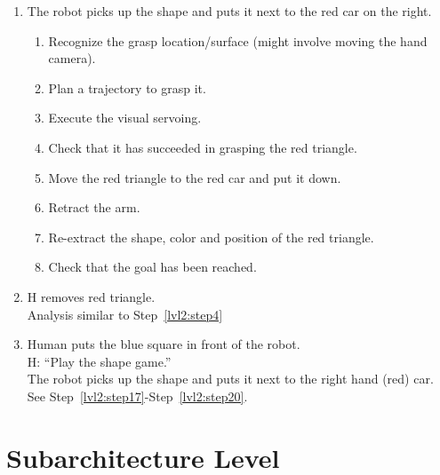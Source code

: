 \documentclass{article}
\begin{document}
\begin{enumerate}
\item \label{lvl2:step19} The robot picks up the shape and puts it
  next to the red car on the right.
  \begin{enumerate}
  \item \label{lvl2:step19:detail1} Recognize the grasp
    location/surface (might involve moving the hand camera).
  \item \label{lvl2:step19:detail2} Plan a trajectory to grasp it.
  \item \label{lvl2:step19:detail3} Execute the visual servoing.
  \item \label{lvl2:step19:detail4} Check that it has succeeded in
    grasping the red triangle.
  \item \label{lvl2:step19:detail5} Move the red triangle to the red
    car and put it down.
  \item \label{lvl2:step19:detail6} Retract the arm.
  \item \label{lvl2:step19:detail7} Re-extract the shape, color and
    position of the red triangle.
  \item \label{lvl2:step19:detail8} Check that the goal has been
    reached.
  \end{enumerate}

\item \label{lvl2:step20}
  H removes red triangle.\\
  Analysis similar to Step~\ref{lvl2:step4}

\item \label{lvl2:step21}
  Human puts the blue square in front of the robot.\\
  H: ``Play the shape game.''\\
  The robot picks up the shape and puts it next to the right hand
  (red) car.\\
  See Step~\ref{lvl2:step17}-Step~\ref{lvl2:step20}.

\end{enumerate}




\section{Subarchitecture Level}
\end{document}
